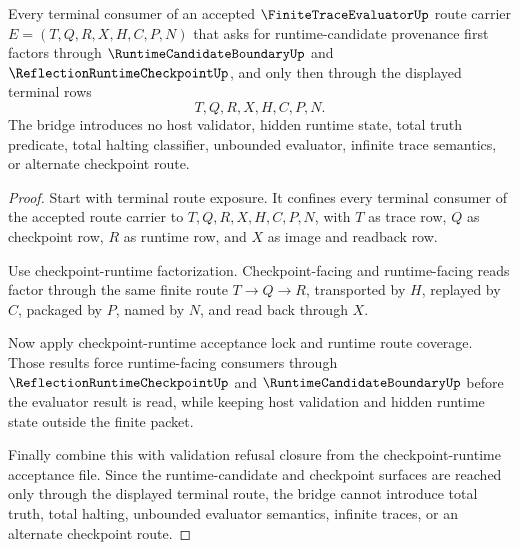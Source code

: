 \begin{theorem}
\label{thm:finite-trace-evaluator-terminal-runtime-candidate-bridge}
Every terminal consumer of an accepted $\FiniteTraceEvaluatorUp$ route carrier $E=(T,Q,R,X,H,C,P,N)$ that asks for runtime-candidate provenance first factors through $\RuntimeCandidateBoundaryUp$ and $\ReflectionRuntimeCheckpointUp$, and only then through the displayed terminal rows
$$
T,Q,R,X,H,C,P,N.
$$
The bridge introduces no host validator, hidden runtime state, total truth predicate, total halting classifier, unbounded evaluator, infinite trace semantics, or alternate checkpoint route.
\end{theorem}
\begin{proof}
Start with terminal route exposure. It confines every terminal consumer of the accepted route carrier to $T,Q,R,X,H,C,P,N$, with $T$ as trace row, $Q$ as checkpoint row, $R$ as runtime row, and $X$ as image and readback row.

Use checkpoint-runtime factorization. Checkpoint-facing and runtime-facing reads factor through the same finite route $T \to Q \to R$, transported by $H$, replayed by $C$, packaged by $P$, named by $N$, and read back through $X$.

Now apply checkpoint-runtime acceptance lock and runtime route coverage. Those results force runtime-facing consumers through $\ReflectionRuntimeCheckpointUp$ and $\RuntimeCandidateBoundaryUp$ before the evaluator result is read, while keeping host validation and hidden runtime state outside the finite packet.

Finally combine this with validation refusal closure from the checkpoint-runtime acceptance file. Since the runtime-candidate and checkpoint surfaces are reached only through the displayed terminal route, the bridge cannot introduce total truth, total halting, unbounded evaluator semantics, infinite traces, or an alternate checkpoint route.
\end{proof}

